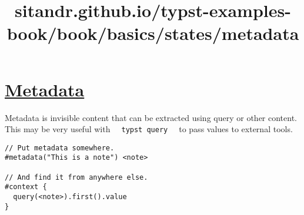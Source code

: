 \title{sitandr.github.io/typst-examples-book/book/basics/states/metadata}

\section{\texorpdfstring{\hyperref[metadata]{Metadata}}{Metadata}}\label{metadata}

Metadata is invisible content that can be extracted using query or other
content. This may be very useful with
\texttt{\ }{\texttt{\ typst\ query\ }}\texttt{\ } to pass values to
external tools.

\begin{verbatim}
// Put metadata somewhere.
#metadata("This is a note") <note>

// And find it from anywhere else.
#context {
  query(<note>).first().value
}
\end{verbatim}

\pandocbounded{}
